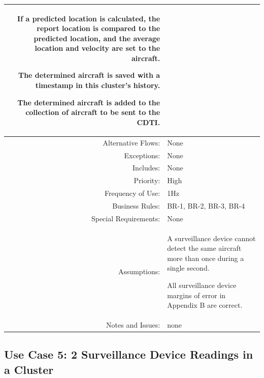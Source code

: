\documentclass[12pt,oneside,letterpaper]{article}
\newenvironment{packed_enumerate}{ %
\vspace{-7mm}
\begin{enumerate}
  \setlength{\itemsep}{0pt}
  \setlength{\parskip}{0pt}
  \setlength{\parsep}{0pt}
}{\end{enumerate}
\vspace{-8mm}}
\begin{document}
\begin{longtable}{|r|p{3.8in}|}
\begin{packed_enumerate}
\item If a predicted location is calculated, the report location is compared to the predicted location, and the average location and velocity are set to the aircraft.
\item The determined aircraft is saved with a timestamp in this cluster's history.
\item The determined aircraft is added to the collection of aircraft to be sent to the CDTI.
\end{packed_enumerate}\\
\hline
Alternative Flows:&None\\
\hline
Exceptions:&None\\
\hline
Includes:&None\\
\hline
Priority:&High\\
\hline
Frequency of Use:&1Hz\\
\hline
Business Rules:&BR-1, BR-2, BR-3, BR-4\\
\hline
Special Requirements:&None\\
\hline
Assumptions: &
\begin{packed_enumerate}
\item A surveillance device cannot detect the same aircraft more than once during a single second.
\item All surveillance device margins of error in Appendix B are correct.
\end{packed_enumerate}\\
\hline
Notes and Issues:&none\\
\hline
\end{longtable}

\subsection{\label{Corr2}Use Case 5: 2 Surveillance Device Readings in a Cluster}
\end{document}
